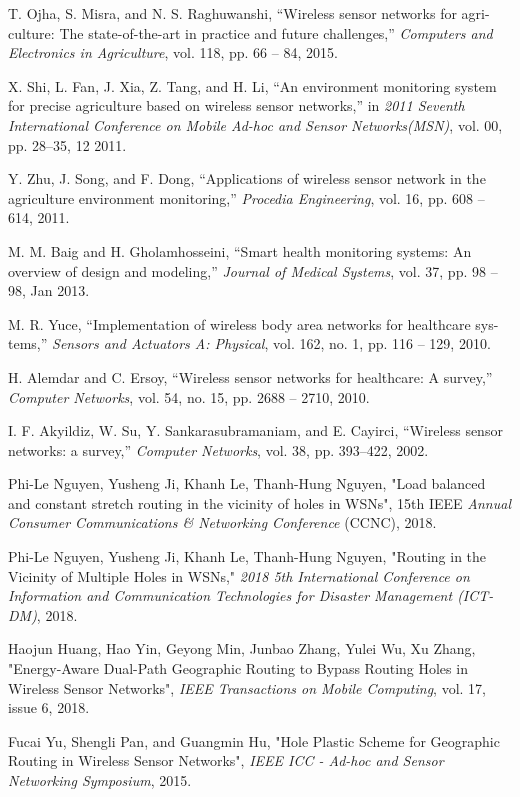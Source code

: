 \documentclass[12pt]{report}
\begin{document}
\begin{thebibliography}{100}
T. Ojha, S. Misra, and N. S. Raghuwanshi, “Wireless sensor networks for agri-
culture: The state-of-the-art in practice and future challenges,” \textit{Computers and Electronics in Agriculture}, vol. 118, pp. 66 – 84, 2015.

X. Shi, L. Fan, J. Xia, Z. Tang, and H. Li, “An environment monitoring system
for precise agriculture based on wireless sensor networks,” in \textit{2011 Seventh International Conference on Mobile Ad-hoc and Sensor Networks(MSN)}, vol. 00,
pp. 28–35, 12 2011.

Y. Zhu, J. Song, and F. Dong, “Applications of wireless sensor network in the
agriculture environment monitoring,” \textit{Procedia Engineering}, vol. 16, pp. 608 –
614, 2011.

M. M. Baig and H. Gholamhosseini, “Smart health monitoring systems: An
overview of design and modeling,” \textit{Journal of Medical Systems}, vol. 37, pp. 98 –
98, Jan 2013.

M. R. Yuce, “Implementation of wireless body area networks for healthcare sys-
tems,” \textit{Sensors and Actuators A: Physical}, vol. 162, no. 1, pp. 116 – 129, 2010.

H. Alemdar and C. Ersoy, “Wireless sensor networks for healthcare: A survey,”
\textit{Computer Networks}, vol. 54, no. 15, pp. 2688 – 2710, 2010.

I. F. Akyildiz, W. Su, Y. Sankarasubramaniam, and E. Cayirci, “Wireless sensor
networks: a survey,” \textit{Computer Networks}, vol. 38, pp. 393–422, 2002.

Phi-Le Nguyen, Yusheng Ji, Khanh Le, Thanh-Hung Nguyen, "Load balanced and constant stretch routing in the vicinity of holes in WSNs", 15th IEEE \textit{Annual Consumer Communications \& Networking Conference} (CCNC), 2018.

Phi-Le Nguyen, Yusheng Ji, Khanh Le, Thanh-Hung Nguyen, "Routing in the Vicinity of Multiple Holes in WSNs," \textit{2018 5th International Conference on Information and Communication Technologies for Disaster Management (ICT-DM)}, 2018.

Haojun Huang, Hao Yin, Geyong Min, Junbao Zhang, Yulei Wu, Xu Zhang, "Energy-Aware Dual-Path Geographic Routing to Bypass Routing Holes in Wireless Sensor Networks", \textit{IEEE Transactions on Mobile Computing}, vol. 17, issue 6, 2018.

Fucai Yu, Shengli Pan, and Guangmin Hu, "Hole Plastic Scheme for Geographic Routing in Wireless Sensor Networks", \textit{IEEE ICC - Ad-hoc and Sensor Networking Symposium}, 2015.


\end{thebibliography}
\end{document}
